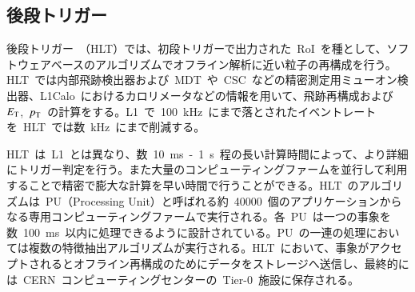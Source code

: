 \subsection{後段トリガー}
後段トリガー~\cite{AR:15}（HLT）では、初段トリガーで出力された~RoI~を種として、ソフトウェアベースのアルゴリズムでオフライン解析に近い粒子の再構成を行う。HLT~では内部飛跡検出器および~MDT~や~CSC~などの精密測定用ミューオン検出器、L1Calo~におけるカロリメータなどの情報を用いて、飛跡再構成および~$E_{\rm{T}}$,~$p_{\rm{T}}$~の計算をする。L1~で~100~kHz~にまで落とされたイベントレートを~HLT~では数~kHz~にまで削減する。

HLT~は~L1~とは異なり、数~10~ms~-~1~s~程の長い計算時間によって、より詳細にトリガー判定を行う。また大量のコンピューティングファームを並行して利用することで精密で膨大な計算を早い時間で行うことができる。HLT~のアルゴリズムは~PU（Processing Unit）と呼ばれる約~40000~個のアプリケーションからなる専用コンピューティングファームで実行される。各~PU~は一つの事象を数~100~ms~以内に処理できるように設計されている。PU~の一連の処理においては複数の特徴抽出アルゴリズムが実行される。HLT~において、事象がアクセプトされるとオフライン再構成のためにデータをストレージへ送信し、最終的には~CERN~コンピューティングセンターの~Tier-0~施設に保存される。
